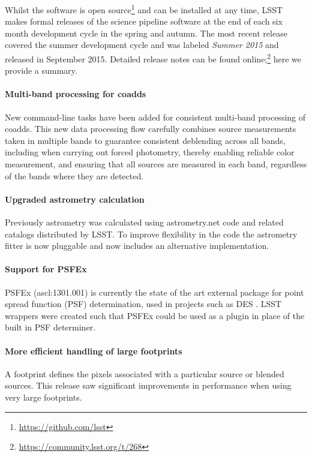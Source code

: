 \documentclass[11pt,twoside]{article}
\begin{document}
Whilst the software is open
source\footnote{\url{https://github.com/lsst}} and can be installed at
any time, LSST makes formal releases of the science pipeline software
at the end of each six month development cycle in the spring and
autumn. The most recent release covered the summer development cycle
and was labeled \emph{Summer 2015} and released in September
2015. Detailed release notes can be found
online;\footnote{\url{https://community.lsst.org/t/268}} here we
provide a summary.

\paragraph{Multi-band processing for coadds} New command-line tasks
have been added for consistent multi-band processing of coadds. This
new data processing flow carefully combines source measurements taken
in multiple bands to guarantee consistent deblending across all bands,
including when carrying out forced photometry, thereby enabling
reliable color measurement, and ensuring that all sources are
measured in each band, regardless of the bands where they are detected.

\paragraph{Upgraded astrometry calculation} Previously astrometry was
calculated using astrometry.net code \citep[][ascl:1208.001]{2010AJ....139.1782L} and
related catalogs distributed by LSST. To improve flexibility in the
code the astrometry fitter is now pluggable and now includes an
alternative implementation.

\paragraph{Support for PSFEx} PSFEx (ascl:1301.001) is currently the state of the art
external package for point spread function (PSF) determination, used
in projects such as DES \citep{2011ASPC..442..435B}. LSST wrappers
were created such that PSFEx could be used as a plugin in place of the
built in PSF determiner.


\paragraph{More efficient handling of large footprints} A footprint
defines the pixels associated with a particular source or blended
sources. This release saw significant improvements in performance when
using very large footprints.
\end{document}
